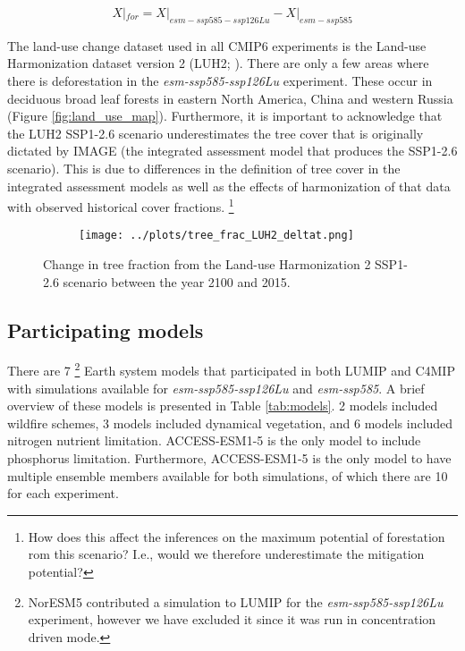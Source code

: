 \documentclass[]{article}
\begin{document}
\begin{equation}
    X|_{for} = X|_{esm-ssp585-ssp126Lu} - X|_{esm-ssp585}
    \label{equ:diff}
\end{equation}

The land-use change dataset used in all CMIP6 experiments is the Land-use Harmonization dataset version 2 (LUH2; \cite{hurtt_harmonization_2020}).
There are only a few areas where there is deforestation in the \textit{esm-ssp585-ssp126Lu} experiment.
These occur in deciduous broad leaf forests in eastern North America, China and western Russia (Figure \ref{fig:land_use_map}).
Furthermore, it is important to acknowledge that the LUH2 SSP1-2.6 scenario underestimates the tree cover that is originally dictated by IMAGE (the integrated assessment model that produces the SSP1-2.6 scenario).
This is due to differences in the definition of tree cover in the integrated assessment models as well as the effects of harmonization of that data with observed historical cover fractions. \footnote{How does this affect the inferences on the maximum potential of forestation rom this scenario? I.e., would we therefore underestimate the mitigation potential?}

\begin{figure}[H]
    \centering
    \begin{subfigure}[b]{\linewidth}
        \texttt{[image: ../plots/tree\_frac\_LUH2\_deltat.png]}
    \end{subfigure}
    \caption{Change in tree fraction from the Land-use Harmonization 2 SSP1-2.6 scenario between the year 2100 and 2015.}
    \label{fig:land_use}
\end{figure}

\subsection{Participating models}

There are 7 \footnote{NorESM5 contributed a simulation to LUMIP for the \textit{esm-ssp585-ssp126Lu} experiment, however we have excluded it since it was run in concentration driven mode.} Earth system models that participated in both LUMIP and C4MIP with simulations available for \textit{esm-ssp585-ssp126Lu} and \textit{esm-ssp585}.
A brief overview of these models is presented in Table \ref{tab:models}.
2 models included wildfire schemes, 3 models included dynamical vegetation, and 6 models included nitrogen nutrient limitation.
ACCESS-ESM1-5 is the only model to include phosphorus limitation.
Furthermore, ACCESS-ESM1-5 is the only model to have multiple ensemble members available for both simulations, of which there are 10 for each experiment.
\end{document}
